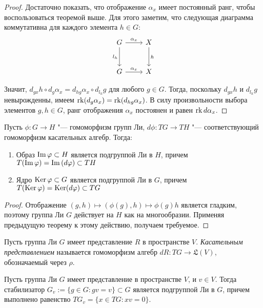 \begin{proof}
	Достаточно показать, что отображение $\alpha_x$ имеет постоянный ранг, чтобы воспользоваться теоремой выше. Для этого заметим, что следующая диаграмма коммутативна для каждого элемента $h \in G$:
	\[
	\begin{tikzcd}[row sep = large]
		G \arrow[swap]{d}{l_{h}} \arrow{r}{\alpha_x} & X \arrow{d}{h}\\
		G \arrow{r}{\alpha_x} & X
	\end{tikzcd}
	\]
	
	Значит, $d_{gx}h \circ d_g{\alpha_x} = d_{hg}{\alpha_x} \circ d_{l_{h}}g$ для любого $g \in G$. Тогда, поскольку $d_{gx}h$ и $d_{l_{h}}g$ невырожденны, имеем $\operatorname{rk} (d_g{\alpha_x}) = \operatorname{rk} (d_{hg}{\alpha_x})$. В силу произвольности выбора элементов $g, h \in G$, ранг отображения $\alpha_x$ постоянен и равен $\operatorname{rk} d{\alpha_x}$.
\end{proof}

\begin{corollary}
	Пусть $\phi: G \to H$ "--- гомоморфизм групп Ли, $d\phi: TG \to TH$ "--- соответствующий гомоморфизм касательных алгебр. Тогда:
	\begin{enumerate}
		\item Образ $\operatorname{Im}\varphi \subset H$ является подгруппой Ли в $H$, причем $T(\operatorname{Im}\varphi) = \operatorname{Im}{(d\varphi)} \subset TH$
		\item Ядро $\operatorname{Ker}\varphi \subset G$ является подгруппой Ли в $G$, причем $T(\operatorname{Ker}\varphi) = \operatorname{Ker}(d\varphi) \subset TG$
	\end{enumerate}
\end{corollary}

\begin{proof}
	Отображение $(g, h) \mapsto (\phi(g), h) \mapsto \phi(g)h$ является гладким, поэтому группа Ли $G$ действует на $H$ как на многообразии. Применяя предыдущую теорему к этому действию, получаем требуемое.
\end{proof}

\begin{definition}
	Пусть группа Ли $G$ имеет представление $R$ в пространстве $V$. \textit{Касательным представлением} называется гомоморфизм алгебр $dR : TG \to \mathfrak L(V)$, обозначаемый через $\rho$.
\end{definition}

\begin{corollary}
	Пусть группа Ли $G$ имеет представление в пространстве $V$, и $v \in V$. Тогда стабилизатор $G_v := \{g \in G: gv = v\} \subset G$ является подгруппой Ли в $G$, причем выполнено равенство $TG_v = \{x \in TG: xv = 0\}$.
\end{corollary}

